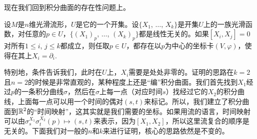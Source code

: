 
现在我们回到积分曲面的存在性问题上。

\begin{pro}\label{pro:3.21}
设$M$是$n$维光滑流形，$U$是它的一个开集。设$\{X_1$, $\dots$, $X_k\}$是开集$U$上的一族光滑函数，对任意的$p\in U$，$\{(X_1)_p$, $\dots$, $(X_k)_p\}$都是线性无关的。如果$[X_i,X_j]=0$对所有$1\leq i$, $j\leq k$都成立，则任取$p\in U$，都存在以$p$为中心的坐标卡$(V,\varphi)$，使得在其上$X_i=\partial_i$.
\end{pro}

特别地，条件告诉我们，此时在$U$上，$X_i$需要是处处非零的。证明的思路在$k=2$且$n=2$的时候是非常直观的，某种程度上还是“编”积分曲面。我们首先找到$X_1$经过$p$的一条积分曲线$\sigma$，然后在$\sigma$上每一点（对应时间$s$）找经过它的$X_2$的积分曲线，上面每一点可以用一个时间的偶对$(s,t)$来标记。所以，我们建立了积分曲面到$\mathbb{R}^2$的“时间映射”，这其实就是我们需要的坐标。如果用流的语言，时间映射可以由$\sigma^{X_1}_s\sigma^{X_2}_t(p)\mapsto (s,t)$来表示，因为$[X_1,X_2]$，所以这里流复合的顺序是无关的。下面我们对一般的$n$和$k$来进行证明，核心的思路依然是不变的。

